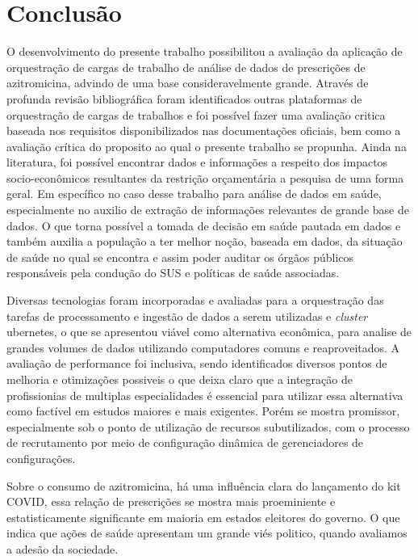 
\chapter{Conclusão}
\label{chap:conclusao}

O desenvolvimento do presente trabalho possibilitou a avaliação da aplicação de orquestração de cargas de trabalho de análise de dados de prescrições de azitromicina, advindo de uma base consideravelmente grande. Através de profunda revisão bibliográfica foram identificados outras plataformas de orquestração de cargas de trabalhos e foi possível fazer uma avaliação critica baseada nos requisitos disponibilizados nas documentações oficiais, bem como a avaliação crítica do proposito ao qual o presente trabalho se propunha. Ainda na literatura, foi possível encontrar dados e informações a respeito dos impactos socio-econômicos resultantes da restrição orçamentária a pesquisa de uma forma geral. Em específico no caso desse trabalho para análise de dados em saúde, especialmente no auxilio de extração de informações relevantes de grande base de dados. O que torna possível a tomada de decisão em saúde pautada em dados e também auxilia a população a ter melhor noção, baseada em dados, da situação de saúde no qual se encontra e assim poder auditar os órgãos públicos responsáveis pela condução do SUS e políticas de saúde associadas.

Diversas tecnologias foram incorporadas e avaliadas para a orquestração das tarefas de processamento e ingestão de dados a serem utilizadas e \emph{cluster} ubernetes, o que se apresentou viável como alternativa econômica, para analise de grandes volumes de dados utilizando computadores comuns e reaproveitados. A avaliação de performance foi inclusiva, sendo identificados diversos pontos de melhoria e otimizações possiveis o que deixa claro que a integração de profissionias de multiplas especialidades é essencial para utilizar essa alternativa como factível em estudos maiores e mais exigentes. Porém se mostra promissor, especialmente sob o ponto de utilização de recursos subutilizados, com o processo de recrutamento por meio de configuração dinâmica de gerenciadores de configurações. 

Sobre o consumo de azitromicina, há uma influência clara do lançamento do kit COVID, essa relação de prescrições se mostra mais proeminiente e estatisticamente significante em maioria em estados eleitores do governo. O que indica que ações de saúde apresentam um grande viés politico, quando avaliamos a adesão da sociedade. 

